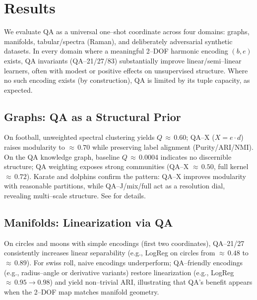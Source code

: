 

\section{Results}

We evaluate QA as a universal one–shot coordinate across four domains: graphs, manifolds, tabular/spectra (Raman), and deliberately adversarial synthetic datasets. In every domain where a meaningful 2–DOF harmonic encoding \((b,e)\) exists, QA invariants (QA–21/27/83) substantially improve linear/semi–linear learners, often with modest or positive effects on unsupervised structure. Where no such encoding exists (by construction), QA is limited by its tuple capacity, as expected.

\subsection{Graphs: QA as a Structural Prior}

On football, unweighted spectral clustering yields \(Q\,\approx\,0.60\); QA–X (\(X=e\cdot d\)) raises modularity to \(\approx\,0.70\) while preserving label alignment (Purity/ARI/NMI). On the QA knowledge graph, baseline \(Q\,\approx\,\)0.0004 indicates no discernible structure; QA weighting exposes strong communities (QA–X \(\approx\,0.50\), full kernel \(\approx\,0.72\)). Karate and dolphins confirm the pattern: QA–X improves modularity with reasonable partitions, while QA–J/mix/full act as a resolution dial, revealing multi–scale structure. See  for details.

\subsection{Manifolds: Linearization via QA}

On circles and moons with simple encodings (first two coordinates), QA–21/27 consistently increases linear separability (e.g., LogReg on circles from \(\approx\,0.48\) to \(\approx\,0.89\)). For swiss roll, naive encodings underperform; QA–friendly encodings (e.g., radius–angle or derivative variants) restore linearization (e.g., LogReg \(\approx\,0.95\to0.98\)) and yield non–trivial ARI, illustrating that QA’s benefit appears when the 2–DOF map matches manifold geometry.

